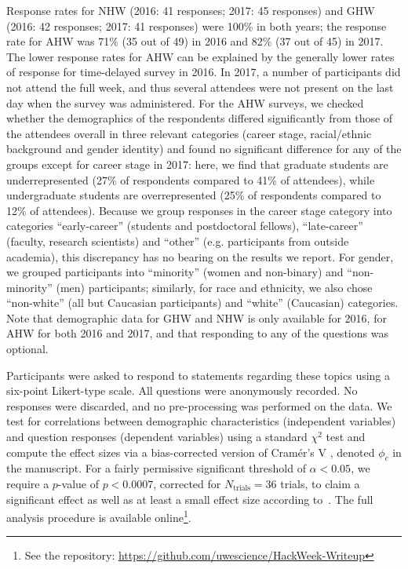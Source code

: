 \documentclass{aastex62}
\begin{document}
Response rates for NHW (2016: 41 responses; 2017: 45 responses) and GHW (2016: 42 responses; 2017: 41 responses) were 100\% in both years; the response rate for AHW was 71\% (35 out of 49) in 2016 and 82\% (37 out of 45) in 2017. The lower response rates for AHW can be explained by the generally lower rates of response for time-delayed survey in 2016. In 2017, a number of participants did not attend the full week, and thus several attendees were not present on the last day when the survey was administered. For the AHW surveys, we checked whether the demographics of the respondents differed significantly from those of the attendees overall in three relevant categories (career stage, racial/ethnic background and gender identity) and found no significant difference for any of the groups except for career stage in 2017: here, we find that graduate students are underrepresented (27\% of respondents compared to 41\% of attendees), while undergraduate students are overrepresented (25\% of respondents compared to 12\% of attendees). Because we group responses in the career stage category into categories ``early-career'' (students and postdoctoral fellows), ``late-career'' (faculty, research scientists) and ``other'' (e.g. participants from outside academia), this discrepancy has no bearing on the results we report. For gender, we grouped participants into ``minority'' (women and non-binary) and ``non-minority'' (men) participants; similarly, for race and ethnicity, we also chose ``non-white'' (all but Caucasian participants) and ``white'' (Caucasian) categories. Note that demographic data for GHW and NHW is only available for 2016, for AHW for both 2016 and 2017, and that responding to any of the questions was optional.

Participants were asked to respond to statements regarding these topics using a six-point Likert-type scale. All questions were anonymously recorded. No responses were discarded, and no pre-processing was performed on the data. We test for correlations between demographic characteristics (independent variables) and question responses (dependent variables) using a standard $\chi^2$ test and compute the effect sizes via a bias-corrected version of Cram\'{e}r's V \citep{cramer1946,bergsma2013}, denoted $\phi_c$ in the manuscript. For a fairly permissive significant threshold of $\alpha < 0.05$, we require a $p$-value of $p < 0.0007$, corrected for $N_\mathrm{trials} = 36$ trials, to claim a significant effect as well as at least a small effect size according to~\citep{cohen1988}. The full analysis procedure is available online\footnote{See the repository: \url{https://github.com/uwescience/HackWeek-Writeup}}.
\end{document}

